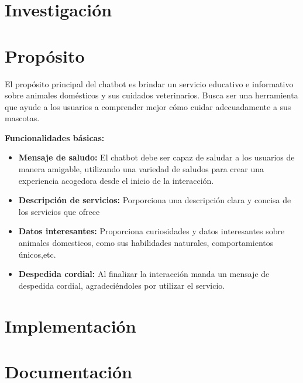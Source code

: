 \documentclass[a4paper,12pt]{article}
\begin{document}


\newpage

\section*{Investigación}

\section*{Propósito}
El propósito principal del chatbot es brindar un servicio educativo e informativo sobre animales domésticos y sus cuidados veterinarios. Busca ser una herramienta que ayude a los usuarios a comprender mejor cómo cuidar adecuadamente a sus mascotas.

\textbf{Funcionalidades básicas:}
\begin{itemize}
    \item \textbf{Mensaje de saludo:} El chatbot debe ser capaz de saludar a los usuarios de manera amigable, utilizando una variedad de saludos para crear una experiencia acogedora desde el inicio de la interacción.
    
    \item \textbf{Descripción de servicios:} Porporciona una descripción clara y concisa de los servicios que ofrece 

    \item \textbf{Datos interesantes:} Proporciona curiosidades y datos interesantes sobre animales domesticos, como sus habilidades naturales, comportamientos únicos,etc.

    \item \textbf{Despedida cordial:} Al finalizar la interacción manda un mensaje de despedida cordial, agradeciéndoles por utilizar el servicio.
\end{itemize}\section*{Implementación}

\section*{Documentación}

\newpage %
\thispagestyle{fancyref}
\printbibliography %
\end{document}

